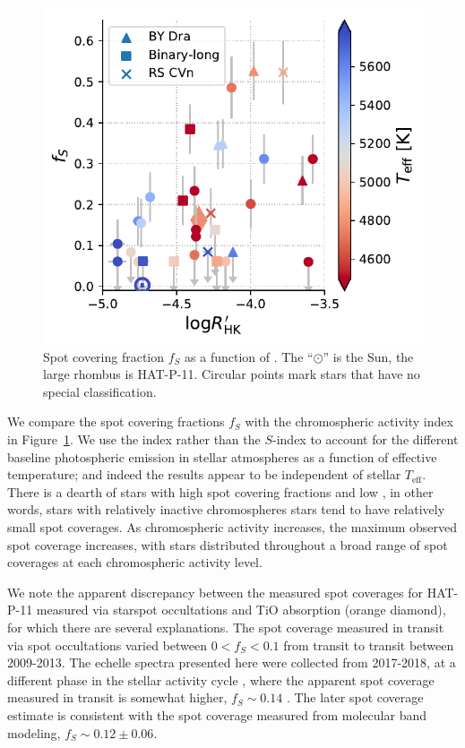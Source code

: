 \begin{figure}
    \centering
    \includegraphics[scale=0.8]{freckles/fs_rprime.pdf}
    \caption{Spot covering fraction $f_S$ as a function of \logrprime. The ``$\odot$'' is the Sun, the large rhombus is HAT-P-11. Circular points mark stars that have no special classification. }
    \label{fig:fs_rprime}
\end{figure}

We compare the spot covering fractions $f_S$ with the chromospheric activity index \logrprime in Figure~\ref{fig:fs_rprime}. We use the \logrprime index rather than the $S$-index to account for the different baseline photospheric emission in stellar atmospheres as a function of effective temperature; and indeed the results appear to be independent of stellar $T_\mathrm{eff}$. There is a dearth of stars with high spot covering fractions and low \logrprime, in other words, stars with relatively inactive chromospheres stars tend to have relatively small spot coverages. As chromospheric activity increases, the maximum observed spot coverage increases, with stars distributed throughout a broad range of spot coverages at each chromospheric activity level. 

We note the apparent discrepancy between the measured spot coverages for HAT-P-11 measured via starspot occultations \citep{Morris2017a} and TiO absorption (orange diamond), for which there are several explanations. The spot coverage measured in transit via spot occultations varied between $0 < f_S < 0.1$ from transit to transit between 2009-2013. The echelle spectra presented here were collected from 2017-2018, at a different phase in the stellar activity cycle \citep{Morris2017b}, where the apparent spot coverage measured in transit is somewhat higher, $f_S \sim 0.14$ \citep{Morris2018d}. The later spot coverage estimate is consistent with the spot coverage measured from molecular band modeling, $f_S \sim 0.12 \pm 0.06$. 

